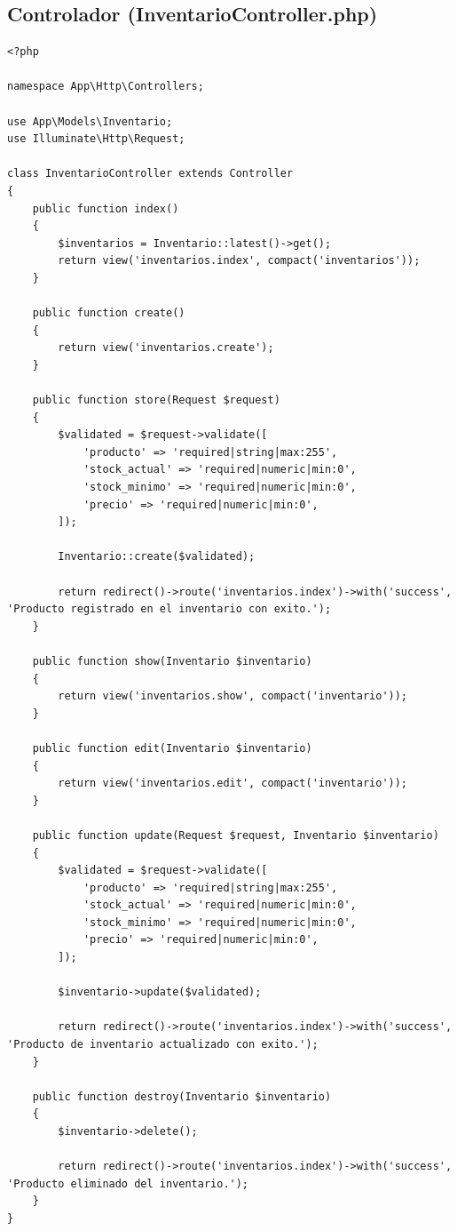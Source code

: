 \documentclass[12pt, letterpaper]{article}
\begin{document}
\subsection{Controlador (InventarioController.php)}
\begin{lstlisting}[language=purePHP]
<?php

namespace App\Http\Controllers;

use App\Models\Inventario;
use Illuminate\Http\Request;

class InventarioController extends Controller
{
    public function index()
    {
        $inventarios = Inventario::latest()->get();
        return view('inventarios.index', compact('inventarios'));
    }

    public function create()
    {
        return view('inventarios.create');
    }

    public function store(Request $request)
    {
        $validated = $request->validate([
            'producto' => 'required|string|max:255',
            'stock_actual' => 'required|numeric|min:0',
            'stock_minimo' => 'required|numeric|min:0',
            'precio' => 'required|numeric|min:0',
        ]);

        Inventario::create($validated);

        return redirect()->route('inventarios.index')->with('success', 'Producto registrado en el inventario con exito.');
    }

    public function show(Inventario $inventario)
    {
        return view('inventarios.show', compact('inventario'));
    }

    public function edit(Inventario $inventario)
    {
        return view('inventarios.edit', compact('inventario'));
    }

    public function update(Request $request, Inventario $inventario)
    {
        $validated = $request->validate([
            'producto' => 'required|string|max:255',
            'stock_actual' => 'required|numeric|min:0',
            'stock_minimo' => 'required|numeric|min:0',
            'precio' => 'required|numeric|min:0',
        ]);

        $inventario->update($validated);

        return redirect()->route('inventarios.index')->with('success', 'Producto de inventario actualizado con exito.');
    }

    public function destroy(Inventario $inventario)
    {
        $inventario->delete();

        return redirect()->route('inventarios.index')->with('success', 'Producto eliminado del inventario.');
    }
}
\end{lstlisting}
\end{document}
